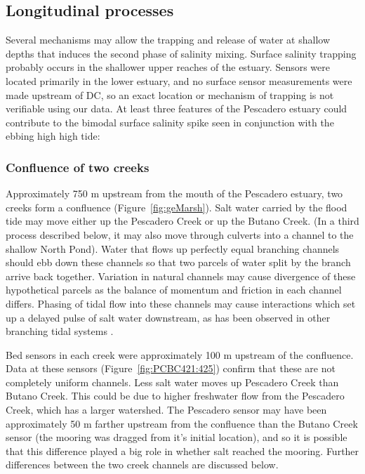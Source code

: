 \subsection{Longitudinal processes}

Several mechanisms may allow the trapping and release of water at shallow depths that induces the second phase of salinity mixing. Surface salinity trapping probably occurs in the shallower upper reaches of the estuary. Sensors were located primarily in the lower estuary, and no surface sensor measurements were made upstream of DC, so an exact location or mechanism of trapping is not verifiable using our data. At least three features of the Pescadero estuary could contribute to the bimodal surface salinity spike seen in conjunction with the ebbing high high tide:

\subsubsection{Confluence of two creeks}
Approximately 750 m upstream from the mouth of the Pescadero estuary, two creeks form a confluence (Figure~\ref{fig:geMarsh}). Salt water carried by the flood tide may move either up the Pescadero Creek or up the Butano Creek. (In a third process described below, it may also move through culverts into a channel to the shallow North Pond). Water that flows up perfectly equal branching channels should ebb down these channels so that two parcels of water split by the branch arrive back together. Variation in natural channels may cause divergence of these hypothetical parcels as the balance of momentum and friction in each channel differs. Phasing of tidal flow into these channels may cause interactions which set up a delayed pulse of salt water downstream, as has been observed in other branching tidal systems \parencite{macvean_estuarine_2011}.

Bed sensors in each creek were approximately 100 m upstream of the confluence. Data at these sensors (Figure~\ref{fig:PCBC421:425}) confirm that these are not completely uniform channels. Less salt water moves up Pescadero Creek than Butano Creek. This could be due to higher freshwater flow from the Pescadero Creek, which has a larger watershed. The Pescadero sensor may have been approximately 50 m farther upstream from the confluence than the Butano Creek sensor (the mooring was dragged from it's initial location), and so it is possible that this difference played a big role in whether salt reached the mooring. Further differences between the two creek channels are discussed below.

